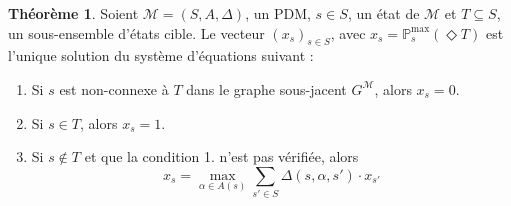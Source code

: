 \documentclass[12pt,a4paper]{report}
\theoremstyle{definition}%
\newtheorem{theorem}{Théorème}[chapter]
\theoremstyle{remark}
\newcommand{\pr}{\mathbb{P}}
\let\labelitemi\labelitemii
\begin{document}
\begin{theorem} \label{PDM-acc-thm}
	Soient $\mathcal{M} = (S, A, \Delta)$, un PDM, $s \in S$, un état de $\mathcal{M}$
	et $T \subseteq S$, un sous-ensemble d'états cible. Le vecteur $(x_s)_{s \in S}$,
	avec $x_s = \pr^{\max}_s(\Diamond T)$ est l'unique solution du système d'équations
	suivant :
	\begin{enumerate}
		\item Si $s$ est non-connexe à $T$ dans le graphe sous-jacent $G^\mathcal{M}$,
			alors $x_s = 0$.
		\item Si $s \in T$, alors $x_s = 1$.
		\item Si $s \not\in T$ et que la condition 1. n'est pas vérifiée, alors
			\[
				x_s = \max_{\alpha \in A(s)} \sum_{s' \in S} \Delta(s, \alpha, s') \cdot x_{s'}
			\]
	\end{enumerate}
\end{theorem}
\end{document}
